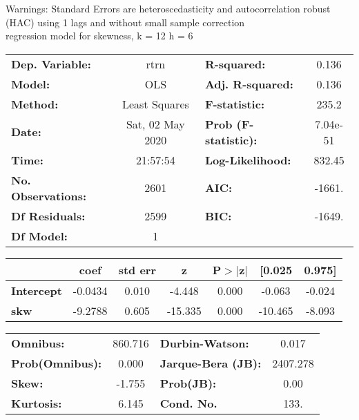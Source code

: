 Warnings: \newline
 [1] Standard Errors are heteroscedasticity and autocorrelation robust (HAC) using 1 lags and without small sample correction\\ 

regression model for skewness, k = 12 h = 6\begin{center}
\begin{tabular}{lclc}
\toprule
\textbf{Dep. Variable:}    &       rtrn       & \textbf{  R-squared:         } &     0.136   \\
\textbf{Model:}            &       OLS        & \textbf{  Adj. R-squared:    } &     0.136   \\
\textbf{Method:}           &  Least Squares   & \textbf{  F-statistic:       } &     235.2   \\
\textbf{Date:}             & Sat, 02 May 2020 & \textbf{  Prob (F-statistic):} &  7.04e-51   \\
\textbf{Time:}             &     21:57:54     & \textbf{  Log-Likelihood:    } &    832.45   \\
\textbf{No. Observations:} &        2601      & \textbf{  AIC:               } &    -1661.   \\
\textbf{Df Residuals:}     &        2599      & \textbf{  BIC:               } &    -1649.   \\
\textbf{Df Model:}         &           1      & \textbf{                     } &             \\
\bottomrule
\end{tabular}
\begin{tabular}{lcccccc}
                   & \textbf{coef} & \textbf{std err} & \textbf{z} & \textbf{P$> |$z$|$} & \textbf{[0.025} & \textbf{0.975]}  \\
\midrule
\textbf{Intercept} &      -0.0434  &        0.010     &    -4.448  &         0.000        &       -0.063    &       -0.024     \\
\textbf{skw}       &      -9.2788  &        0.605     &   -15.335  &         0.000        &      -10.465    &       -8.093     \\
\bottomrule
\end{tabular}
\begin{tabular}{lclc}
\textbf{Omnibus:}       & 860.716 & \textbf{  Durbin-Watson:     } &    0.017  \\
\textbf{Prob(Omnibus):} &   0.000 & \textbf{  Jarque-Bera (JB):  } & 2407.278  \\
\textbf{Skew:}          &  -1.755 & \textbf{  Prob(JB):          } &     0.00  \\
\textbf{Kurtosis:}      &   6.145 & \textbf{  Cond. No.          } &     133.  \\
\bottomrule
\end{tabular}
\end{center}

